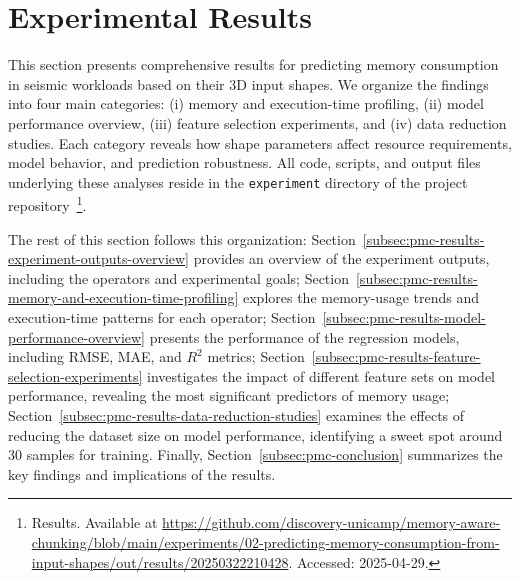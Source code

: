 \section{Experimental Results}
\label{sec:pmc-results}

This section presents comprehensive results for predicting memory consumption in seismic workloads based on their \ac{3D} input shapes.
We organize the findings into four main categories:
(i) memory and execution-time profiling,
(ii) model performance overview,
(iii) feature selection experiments,
and (iv) data reduction studies.
Each category reveals how shape parameters affect resource requirements, model behavior, and prediction robustness.
All code, scripts, and output files underlying these analyses reside in the \texttt{experiment} directory of the project repository~\footnote{Results. Available at \url{https://github.com/discovery-unicamp/memory-aware-chunking/blob/main/experiments/02-predicting-memory-consumption-from-input-shapes/out/results/20250322210428}. Accessed: 2025-04-29.}.

The rest of this section follows this organization:
Section~\ref{subsec:pmc-results-experiment-outputs-overview} provides an overview of the experiment outputs, including the operators and experimental goals;
Section~\ref{subsec:pmc-results-memory-and-execution-time-profiling} explores the memory-usage trends and execution-time patterns for each operator;
Section~\ref{subsec:pmc-results-model-performance-overview} presents the performance of the regression models, including \ac{RMSE}, \ac{MAE}, and $R^2$ metrics;
Section~\ref{subsec:pmc-results-feature-selection-experiments} investigates the impact of different feature sets on model performance, revealing the most significant predictors of memory usage;
Section~\ref{subsec:pmc-results-data-reduction-studies} examines the effects of reducing the dataset size on model performance, identifying a sweet spot around 30 samples for training.
Finally, Section~\ref{subsec:pmc-conclusion} summarizes the key findings and implications of the results.





